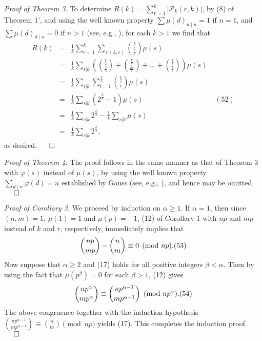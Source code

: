 \documentclass[12pt]{amsart}
\begin{document}
{\vspace{2mm}

{\it Proof of Theorem 3}. To determine 
$R(k)=\sum_{r=1}^{k}|{\mathcal P}_k(r,k)|$, by (8) of Theorem 1',
and using the well    known property $\sum\mu(d)_{d\mid n}=1$ if $n=1$, and 
$\sum\mu(d)_{d\mid n}=0$ if $n>1$ (see, e.g., \cite{sh}), 
for each $k>1$ we find that  
    \begin{eqnarray*}
R(k)&=&\frac{1}{k}\sum_{r=1}^{k}\sum_{s|(k,r)}{\frac{k}{s}\choose
\frac{r}{s}}\mu(s)\\
&=&\frac{1}{k}\sum_{s|k}\left({\frac{k}{s}\choose\frac{s}{s}}+
{\frac{k}{s}\choose\frac{2s}{s}}+\ldots+{\frac{k}{s}\choose\frac{k}{s}}\right)
\mu(s)\\
&=&\frac{1}{k}\sum_{s|k}\sum_{i=1}^{\frac{k}{s}}{\frac{k}{s}\choose i}\mu(s)\\
&=&\frac{1}{k}\sum_{s|k}\left(2^{\frac{k}{s}}-1\right)\mu(s)
\qquad\qquad\qquad\qquad\qquad (52)\\
&=&\frac{1}{k}\sum_{s|k}2^{\frac{k}{s}}- \frac{1}{k}\sum_{s|k}\mu(s)
\\
&=&\frac{1}{k}\sum_{s|k}2^{\frac{k}{s}},
  \end{eqnarray*}
as desired. \hfill$\qed$


\vspace{2mm} 

{\it Proof of Theorem 4.} The proof follows in the same manner as that of
Theorem 3 with $\varphi(s)$ instead of $\mu(s)$, by using the well known 
property $\sum_{d\mid n}\varphi(d)=n$ established by Gauss 
(see, e.g., \cite{sh}), and hence may be omitted.
\hfill$\qed$

\vspace{2mm}



{\it Proof of Corollary 3.}  We proceed by induction on $\alpha\ge 1$. 
If $\alpha =1$, then since $(n,m)=1$, $\mu(1)=1$ and $\mu(p)=-1$,  
 (12) of Corollary 1 with $np$ and $mp$ 
instead of $k$ and $r$, respectively, immediately implies that
 $$
{np \choose mp}- {n \choose m}\equiv 0\pmod{np}.\relax(53)
$$
Now suppose that $\alpha\ge 2$ and (17) holds for all 
positive integers $\beta<\alpha$. Then by using 
the fact that $\mu(p^{\beta})=0$ for each $\beta >1$, (12) gives  
$$
{np^{\alpha} \choose mp^{\alpha}}\equiv {np^{{\alpha}-1} 
\choose mp^{{\alpha}-1}} \pmod{np^{\alpha}}.\relax(54)
$$
The above congruence together with the induction hypothesis
$
{np^{{\alpha}-1} \choose mp^{{\alpha}-1}}\equiv {n \choose m}\pmod{np}
$
yields  (17). This completes the induction proof. 
\hfill$\qed$
\vspace{2mm}

}
\end{document}
